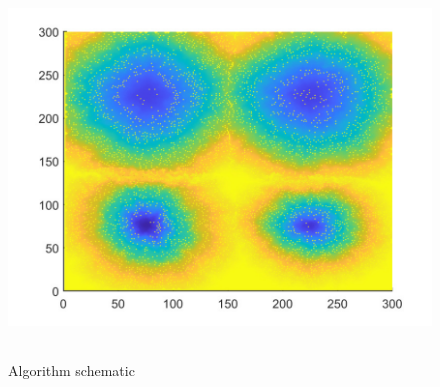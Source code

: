 \documentclass{mcmthesis}
\begin{document}
\begin{figure}[H] 
	\centering 
	\includegraphics[height=10cm]{./T5Figure/K2N2/K2N2L.pdf}
	\caption{Algorithm schematic}
\end{figure}
\end{document}

